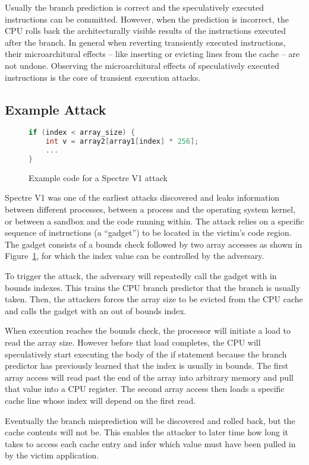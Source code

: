 Usually the branch prediction is correct and the speculatively executed instructions can be committed.
However, when the prediction is incorrect, the CPU rolls back the architecturally visible results of the instructions executed after the branch.
In general when reverting transiently executed instructions, their microarchitural effects -- like inserting or evicting lines from the cache -- are not undone.
Observing the  microarchitural effects of speculatively executed instructions is the core of transient execution attacks.

\subsection{Example Attack}
\begin{figure}[h]
\begin{lstlisting}[language=C, style=codeStyle]
if (index < array_size) {
    int v = array2[array1[index] * 256];
    ...
}
\end{lstlisting}
\caption{Example code for a Spectre V1 attack}
\label{fig:spectre-code}
\end{figure}
Spectre V1 was one of the earliest attacks discovered and leaks information between different processes, between a process and the operating system kernel, or between a sandbox and the code running within.
The attack relies on a specific sequence of instructions (a ``gadget'') to be located in the victim's code region.
The gadget consists of a bounds check followed by two array accesses as shown in Figure~\ref{fig:spectre-code}, for which the index value can be controlled by the adversary.

To trigger the attack, the adversary will repeatedly call the gadget with in bounds indexes.
This trains the CPU branch predictor that the branch is usually taken.
Then, the attackers forces the array size to be evicted from the CPU cache and calls the gadget with an out of bounds index.

When execution reaches the bounds check, the processor will initiate a load to read the array size.
However before that load completes, the CPU will speculatively start executing the body of the if statement because the branch predictor has previously learned that the index is usually in bounds.
The first array access will read past the end of the array into arbitrary memory and pull that value into a CPU register.
The second array access then loads a specific cache line whose index will depend on the first read.

Eventually the branch misprediction will be discovered and rolled back, but the cache contents will not be.
This enables the attacker to later time how long it takes to access each cache entry and infer which value must have been pulled in by the victim application.

